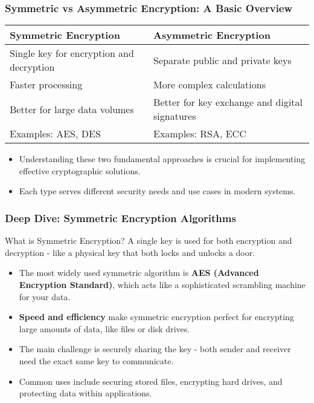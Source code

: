 \documentclass{beamer}
\begin{document}
\begin{frame}
    \frametitle{Symmetric vs Asymmetric Encryption: A Basic Overview}
    
    \begin{tabular}{|p{}|p{}|}
    \hline
    \textbf{Symmetric Encryption} & \textbf{Asymmetric Encryption} \\
    \hline
    Single key for encryption and decryption & Separate public and private keys \\
    \hline
    Faster processing & More complex calculations \\
    \hline
    Better for large data volumes & Better for key exchange and digital signatures \\
    \hline 
    Examples: AES, DES & Examples: RSA, ECC \\
    \hline
    \end{tabular}
    
    \begin{itemize}
        \item Understanding these two fundamental approaches is crucial for implementing effective cryptographic solutions.
        
        \item Each type serves different security needs and use cases in modern systems.
    \end{itemize}
\end{frame}

\begin{frame}
    \frametitle{Deep Dive: Symmetric Encryption Algorithms}
    
    \begin{block}{What is Symmetric Encryption?}
        A single key is used for both encryption and decryption - like a physical key that both locks and unlocks a door.
    \end{block}
    
    \begin{itemize}
        \item The most widely used symmetric algorithm is \textbf{AES (Advanced Encryption Standard)}, which acts like a sophisticated scrambling machine for your data.
        
        \item \textbf{Speed and efficiency} make symmetric encryption perfect for encrypting large amounts of data, like files or disk drives.
        
        \item The main challenge is securely sharing the key - both sender and receiver need the exact same key to communicate.
        
        \item Common uses include securing stored files, encrypting hard drives, and protecting data within applications.
    \end{itemize}
\end{frame}
\end{document}
